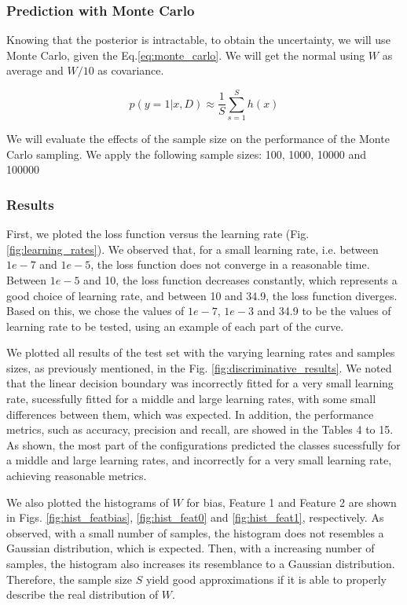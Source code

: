 \documentclass{article}
\begin{document}
\subsubsection{Prediction with Monte Carlo}

Knowing that the posterior is intractable, to obtain the uncertainty, we will use Monte Carlo, given the Eq.\eqref{eq:monte_carlo}. We will get the normal using $W$ as average and $W/10$ as covariance.

\begin{equation}
  \label{eq:monte_carlo}
  p(y=1|x, D) \approx \frac{1}{S}\sum_{s=1}^{S}h(x) 
\end{equation}

We will evaluate the effects of the sample size on the performance of the Monte Carlo sampling. We apply the following sample sizes: 100, 1000, 10000 and 100000

\subsubsection{Results}

First, we ploted the loss function versus the learning rate (Fig. \ref{fig:learning_rates}). We observed that, for a small learning rate, i.e. between $1e-7$ and $1e-5$, the loss function does not converge in a reasonable time. Between $1e-5$ and 10, the loss function decreases constantly, which represents a good choice of learning rate, and between 10 and 34.9, the loss function diverges. Based on this, we chose the values of $1e-7$, $1e-3$ and 34.9 to be the values of learning rate to be tested, using an example of each part of the curve.

We plotted all results of the test set with the varying learning rates and samples sizes, as previously mentioned, in the Fig. \ref{fig:discriminative_results}. We noted that the linear decision boundary was incorrectly fitted for a very small learning rate, sucessfully fitted for a middle and large learning rates, with some small differences between them, which was expected. In addition, the performance metrics, such as accuracy, precision and recall, are showed in the Tables 4 to 15. As shown, the most part of the configurations predicted the classes sucessfully for a middle and large learning rates, and incorrectly for a very small learning rate, achieving reasonable metrics.

We also plotted the histograms of $W$ for bias, Feature 1 and Feature 2 are shown in Figs. \ref{fig:hist_featbias}, \ref{fig:hist_feat0} and \ref{fig:hist_feat1}, respectively. As observed, with a small number of samples, the histogram does not resembles a Gaussian distribution, which is expected. Then, with a increasing number of samples, the histogram also increases its resemblance to a Gaussian distribution. Therefore, the sample size $S$ yield good approximations if it is able to properly describe the real distribution of $W$. 
\end{document}
